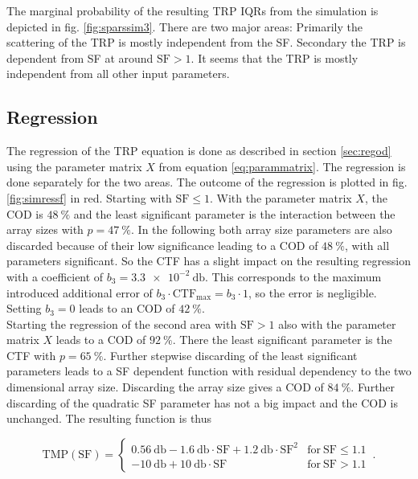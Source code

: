The marginal probability of the resulting \ac{TRP} \acp{IQR} from the simulation is depicted in fig. \ref{fig:sparssim3}. There are two major areas: Primarily the scattering of the \ac{TRP} is mostly independent from the \ac{SF}. Secondary the \ac{TRP} is dependent from \ac{SF} at around $\text{SF} > 1$. It seems that the \ac{TRP} is mostly independent from all other input parameters.

\subsection{Regression}

The regression of the \ac{TRP} equation is done as described in section \ref{sec:regod} using the parameter matrix $X$ from equation \ref{eq:parammatrix}. The regression is done separately for the two areas. The outcome of the regression is plotted in fig. \ref{fig:simressf} in red.
Starting with $\text{SF}\le 1$. With the parameter matrix $X$, the \ac{COD} is $\SI{48}{\percent}$ and the least significant parameter is the interaction between the array sizes with $p = \SI{47}{\percent}$. In the following both array size parameters are also discarded because of their low significance leading to a \ac{COD} of $\SI{48}{\percent}$, with all parameters significant. So the \ac{CTF} has a slight impact on the resulting regression with a coefficient of $b_3=\SI{3.3e-2}{\decibel}$. This corresponds to the maximum introduced additional error of $b_3\cdot\text{CTF}_\text{max}=b_3\cdot 1$, so the error is negligible. Setting $b_3 = 0$ leads to an \ac{COD} of $\SI{42}{\percent}$.\\
Starting the regression of the second area with $\text{SF} > 1$ also with the parameter matrix $X$ leads to a \ac{COD} of $\SI{92}{\percent}$. There the least significant parameter is the \ac{CTF} with $p = \SI{65}{\percent}$. Further stepwise discarding of the least significant parameters leads to a \ac{SF} dependent function with residual dependency to the two dimensional array size. Discarding the array size gives a \ac{COD} of $\SI{84}{\percent}$. Further discarding of the quadratic \ac{SF} parameter has not a big impact and the \ac{COD} is unchanged. The resulting function is thus

\begin{equation}
\text{TMP}\left(\text{SF}\right)=\begin{cases} 
\SI{0.56}{\decibel}-\SI{1.6}{\decibel}\cdot \text{SF}+\SI{1.2}{\decibel}\cdot\text{SF}^2 & \text{for}\ \text{SF}\le 1.1\\
\SI{-10}{\decibel}+\SI{10}{\decibel}\cdot\text{SF} & \text{for}\ \text{SF}>1.1\end{cases}\,.
\end{equation}


